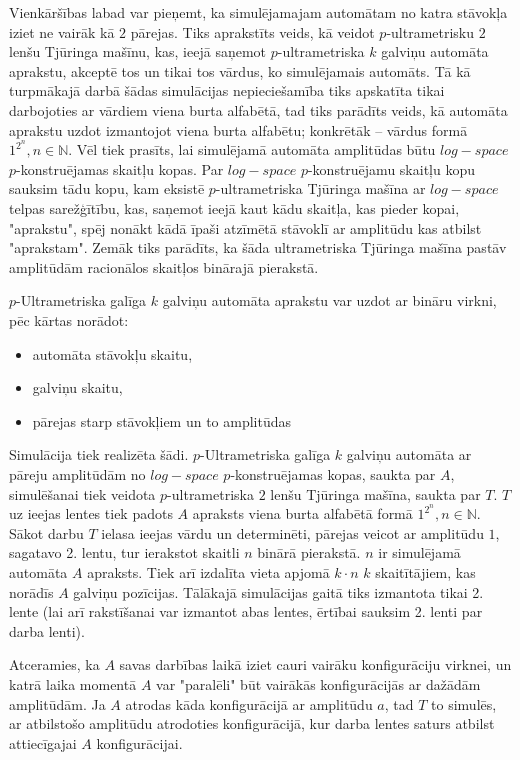 \documentclass{ludis}
\begin{document}
Vienkāršības labad var pieņemt, ka simulējamajam automātam no katra stāvokļa iziet ne vairāk kā $2$ pārejas. Tiks aprakstīts veids, kā veidot $p$-ultrametrisku $2$ lenšu Tjūringa mašīnu, kas, ieejā saņemot $p$-ultrametriska $k$ galviņu automāta aprakstu, akceptē tos un tikai tos vārdus, ko simulējamais automāts. Tā kā turpmākajā darbā šādas simulācijas nepieciešamība tiks apskatīta tikai darbojoties ar vārdiem viena burta alfabētā, tad tiks parādīts veids, kā automāta aprakstu uzdot izmantojot viena burta alfabētu; konkrētāk -- vārdus formā $1^{2^n}, n \in \mathbb{N}$. Vēl tiek prasīts, lai simulējamā automāta amplitūdas būtu $log-space$ $p$-konstruējamas skaitļu kopas. Par $log-space$ $p$-konstruējamu skaitļu kopu sauksim tādu kopu, kam eksistē $p$-ultrametriska Tjūringa mašīna ar $log-space$ telpas sarežģītību, kas, saņemot ieejā kaut kādu skaitļa, kas pieder kopai, "aprakstu", spēj nonākt kādā īpaši atzīmētā stāvoklī ar amplitūdu kas atbilst "aprakstam". Zemāk tiks parādīts, ka šāda ultrametriska Tjūringa mašīna pastāv amplitūdām racionālos skaitļos binārajā pierakstā.

$p$-Ultrametriska galīga $k$ galviņu automāta aprakstu var uzdot ar bināru virkni, pēc kārtas norādot:
\begin{itemize}
	\item automāta stāvokļu skaitu,
	\item galviņu skaitu,
	\item pārejas starp stāvokļiem un to amplitūdas %
\end{itemize}

Simulācija tiek realizēta šādi. $p$-Ultrametriska galīga $k$ galviņu automāta ar pāreju amplitūdām no $log-space$ $p$-konstruējamas kopas, saukta par $A$, simulēšanai tiek veidota $p$-ultrametriska $2$ lenšu Tjūringa mašīna, saukta par $T$. $T$ uz ieejas lentes tiek padots $A$ apraksts viena burta alfabētā formā $1^{2^n}, n \in \mathbb{N}$. Sākot darbu $T$ ielasa ieejas vārdu un determinēti, pārejas veicot ar amplitūdu $1$, sagatavo 2. lentu, tur ierakstot skaitli $n$ binārā pierakstā. $n$ ir simulējamā automāta $A$ apraksts. Tiek arī izdalīta vieta apjomā $k \cdot n$ $k$ skaitītājiem, kas norādīs $A$ galviņu pozīcijas. Tālākajā simulācijas gaitā tiks izmantota tikai 2. lente (lai arī rakstīšanai var izmantot abas lentes, ērtībai sauksim 2. lenti par darba lenti).

Atceramies, ka $A$ savas darbības laikā iziet cauri vairāku konfigurāciju virknei, un katrā laika momentā $A$ var "paralēli" būt vairākās konfigurācijās ar dažādām amplitūdām. %
Ja $A$ atrodas kāda konfigurācijā ar amplitūdu $a$, tad $T$ to simulēs, ar atbilstošo amplitūdu atrodoties konfigurācijā, kur darba lentes saturs atbilst attiecīgajai $A$ konfigurācijai.
\end{document}
